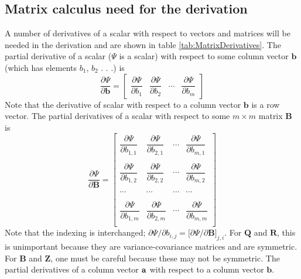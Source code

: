 \documentclass[]{article}
\def\UPS{\mbox{\boldmath $\Upsilon$}}
\def\XI{\mbox{\boldmath $\Xi$}}
\def\BB{\mbox{$\mathbf B$}}	\def\bb{\mbox{$\mathbf b$}} \def\Bb{\mbox{$\mathbf J$}} \def\Ba{\mbox{$\mathbf L$}} \def\Bm{\UPS}
\def\QQ{\mbox{$\mathbf Q$}}	 \def\qq{\mbox{$\mathbf q$}} \def\Qb{\mbox{$\mathbf G$}}  \def\Qm{\mathbb{Q}}
\def\RR{\mbox{$\mathbf R$}}	 \def\rr{\mbox{$\mathbf r$}} \def\Rb{\mbox{$\mathbf H$}}	\def\Rm{\mathbb{R}}
\def\ZZ{\mbox{$\mathbf Z$}}	\def\zz{\mbox{$\mathbf z$}}	\def\Zb{\mbox{$\mathbf M$}} \def\Za{\mbox{$\mathbf N$}} \def\Zm{\XI}
\begin{document}
\subsection{Matrix calculus need for the derivation}\label{sec:MatrixDerivatives}
A number of derivatives of a scalar with respect to vectors and matrices will be needed in the derivation and are shown in table \ref{tab:MatrixDerivatives}. The partial derivative of a scalar ($\Psi$ is a scalar) with respect to some column vector $\bb$ (which has elements $b_1$, $b_2$ . . .) is 
\begin{equation*}
\frac{\partial\Psi}{\partial\bb}=
\begin{bmatrix}
\dfrac{\partial\Psi}{\partial b_1}& \dfrac{\partial\Psi}{\partial b_2}& \cdots& \dfrac{\partial\Psi}{\partial b_m}
\end{bmatrix}
\end{equation*}
 Note that the derivative of scalar with respect to a column vector $\bb$ is a row vector. The partial derivatives of a scalar with respect to some $m \times m$ matrix $\BB$ is
\begin{equation*}
\frac{\partial\Psi}{\partial\BB}=
\begin{bmatrix}
\dfrac{\partial\Psi}{\partial b_{1,1}}& \dfrac{\partial\Psi}{\partial b_{2,1}}& \cdots& \dfrac{\partial\Psi}{\partial b_{m,1}}\\
\\
\dfrac{\partial\Psi}{\partial b_{1,2}}& \dfrac{\partial\Psi}{\partial b_{2,2}}& \cdots& \dfrac{\partial\Psi}{\partial b_{m,2}}\\
\\
\cdots&  \cdots&  \cdots&  \cdots\\
\\
\dfrac{\partial\Psi}{\partial b_{1,m}}& \dfrac{\partial\Psi}{\partial b_{2,m}}& \cdots& \dfrac{\partial\Psi}{\partial b_{m,m}}\\
\end{bmatrix}
\end{equation*} 
Note that the indexing is interchanged; $\partial\Psi/\partial b_{i,j}=\big[\partial\Psi/\partial\BB\big]_{j,i}$. For $\QQ$ and $\RR$, this is unimportant because they are variance-covariance matrices and are symmetric. For $\BB$ and $\ZZ$, one must be careful because these may not be symmetric. The partial derivatives of a column vector $\aa$ with respect to a column vector $\bb$.
\end{document}
